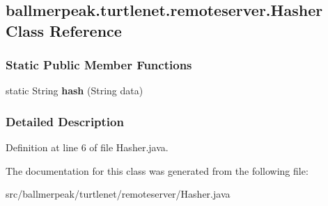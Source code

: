 \hypertarget{classballmerpeak_1_1turtlenet_1_1remoteserver_1_1Hasher}{\subsection{ballmerpeak.\-turtlenet.\-remoteserver.\-Hasher Class Reference}
\label{classballmerpeak_1_1turtlenet_1_1remoteserver_1_1Hasher}
}
\subsubsection*{Static Public Member Functions}
\begin{DoxyCompactItemize}
\item 
\hypertarget{classballmerpeak_1_1turtlenet_1_1remoteserver_1_1Hasher_ab0249de6a9191c8890b9d2e2100a63ef}{static String {\bfseries hash} (String data)}\label{classballmerpeak_1_1turtlenet_1_1remoteserver_1_1Hasher_ab0249de6a9191c8890b9d2e2100a63ef}

\end{DoxyCompactItemize}


\subsubsection{Detailed Description}


Definition at line 6 of file Hasher.\-java.



The documentation for this class was generated from the following file\-:\begin{DoxyCompactItemize}
\item 
src/ballmerpeak/turtlenet/remoteserver/Hasher.\-java\end{DoxyCompactItemize}
